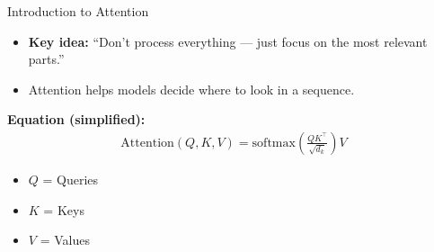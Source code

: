 \begin{frame}{Introduction to Attention}
    \begin{itemize}
        \item \textbf{Key idea:} “Don’t process everything — just focus on the most relevant parts.”
        \item Attention helps models decide where to look in a sequence.
    \end{itemize}
    \vspace{1em}
    \textbf{Equation (simplified):}
    \begin{align*}
        \text{Attention}(Q, K, V) = \mathrm{softmax}\left(\frac{QK^\top}{\sqrt{d_k}}\right)V
    \end{align*}
    \begin{itemize}
        \item $Q$ = Queries
        \item $K$ = Keys
        \item $V$ = Values
    \end{itemize}
\end{frame}

